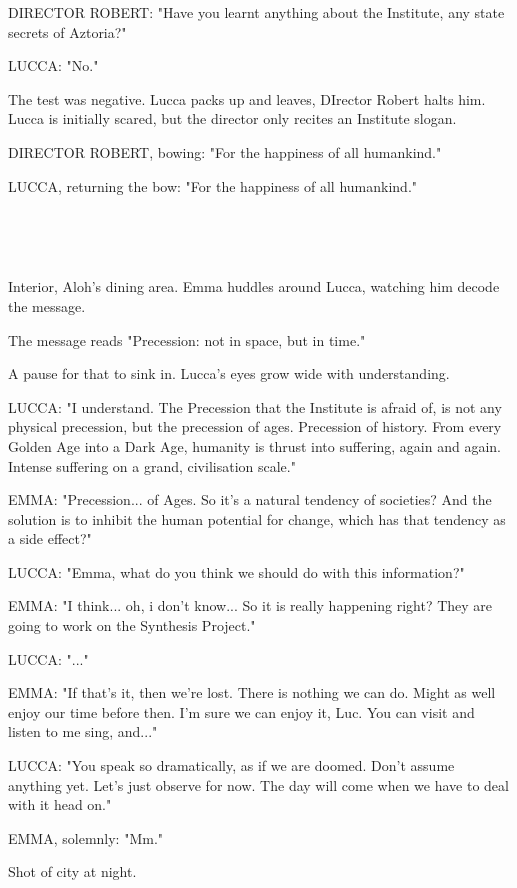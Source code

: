 \documentclass[11pt]{article}
\begin{document}
DIRECTOR ROBERT: "Have you learnt anything about the Institute, any state secrets of Aztoria?"

LUCCA: "No."

The test was negative.
Lucca packs up and leaves, DIrector Robert halts him.
Lucca is initially scared, but the director only recites an Institute slogan.

DIRECTOR ROBERT, bowing: "For the happiness of all humankind."

LUCCA, returning the bow: "For the happiness of all humankind."

\ 

\ 

Interior, Aloh's dining area. 
Emma huddles around Lucca, watching him decode the message.

The message reads "Precession: not in space, but in time."

A pause for that to sink in.
Lucca's eyes grow wide with understanding.

LUCCA: "I understand.
The Precession that the Institute is afraid of, is not any physical precession, but the precession of ages.
Precession of history.
From every Golden Age into a Dark Age, humanity is thrust into suffering, again and again.
Intense suffering on a grand, civilisation scale."

EMMA: "Precession... of Ages.
So it's a natural tendency of societies?
And the solution is to inhibit the human potential for change, which has that tendency as a side effect?"

LUCCA: "Emma, what do you think we should do with this information?"

EMMA: "I think... oh, i don't know...
So it is really happening right?
They are going to work on the Synthesis Project."

LUCCA: "..."

EMMA: "If that's it, then we're lost.
There is nothing we can do.
Might as well enjoy our time before then.
I'm sure we can enjoy it, Luc.
You can visit and listen to me sing, and..."

LUCCA: "You speak so dramatically, as if we are doomed.
Don't assume anything yet. 
Let's just observe for now.
The day will come when we have to deal with it head on."

EMMA, solemnly: "Mm."

Shot of city at night.
\end{document}
